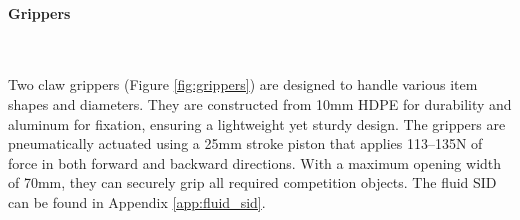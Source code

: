 \vspace{-0.3cm}
\paragraph{Grippers} \ \\
\vspace{-0.5cm}

Two claw grippers (Figure \ref{fig:grippers}) are designed to handle various item shapes and diameters. They are constructed from 10mm HDPE for durability and aluminum for fixation, ensuring a lightweight yet sturdy design. The grippers are pneumatically actuated using a 25mm stroke piston that applies 113–135N of force in both forward and backward directions. With a maximum opening width of 70mm, they can securely grip all required competition objects. The fluid SID can be found in Appendix \ref{app:fluid_sid}.

